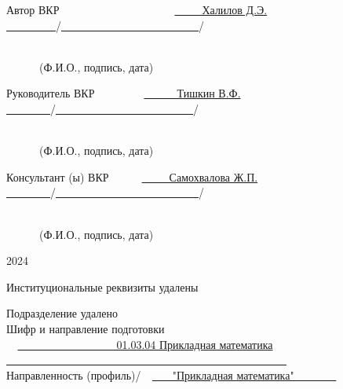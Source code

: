 \documentclass[a4paper,14pt,russian]{extreport}
\renewcommand{\_}{\kern-1.5pt\textunderscore\kern-1.5pt}
\begin{document}
	\begin{flushleft}
		Автор ВКР\ \ \ \ \ \ \ \ \ \ \ \ \ \ \ \ \ \ \ \ \  \uline{\ \ \ \ \  Халилов Д.Э. \ \ \ \ \ \ \ \ \  }/\uline{\ \ \ \ \ \ \ \ \ \ \ \ \ \ \ \ \ \ \ \ \ \ \ \ \  }/\par
		
		{\fontsize{10pt}{12.0pt}\selectfont \ \ \ \ \ \ \ \ \ \ \ \ \ \ \ \ \ \ \ \ \ \ \ \ \ \ \ \ \ \ \ \ \ \ \ \ \ \ \ \ \ \ \ \ \ \ \ \ \ \ \ \ \ \ \ \ \ \ \ \ \ \ \ \ \ \ \ \ \ \ \ \ \ \ \ \ \ \  (Ф.И.О., подпись, дата)\par}
		
		Руководитель ВКР\ \ \ \ \ \ \ \ \ \uline{\ \ \ \ \ \ Тишкин В.Ф. \ \ \ \ \ \ \ \  }/\uline{\ \ \ \ \ \ \ \ \ \ \ \ \ \ \ \ \ \ \ \ \ \ \ \ \  }/\par
		
		{\fontsize{10pt}{12.0pt}\selectfont \ \ \ \ \ \ \ \ \ \ \ \ \ \ \ \ \ \ \ \ \ \ \ \ \ \ \ \ \ \ \ \ \ \ \ \ \ \ \ \ \ \ \ \ \ \ \ \ \ \ \ \ \ \ \ \ \ \ \ \ \ \ \ \ \ \ \ \ \ \ \ \ \ \ \ \ \ \  (Ф.И.О., подпись, дата)\par}
		
		Консультант (ы) ВКР\  \ \ \ \ \  \uline{\ \ \ \ \ Самохвалова Ж.П. \ \ \ \ \ \ \ \  }/\uline{\ \ \ \ \ \ \ \ \ \ \ \ \ \ \ \ \ \ \ \ \ \ \ \ \ \  }/\par
		
		{\fontsize{10pt}{12.0pt}\selectfont \ \ \ \ \ \ \ \ \ \ \ \ \ \ \ \ \ \ \ \ \ \ \ \ \ \ \ \ \ \ \ \ \ \ \ \ \ \ \ \ \ \ \ \ \ \ \ \ \ \ \ \ \ \ \ \ \ \ \ \ \ \ \ \ \ \ \ \ \ \ \ \ \ \ \ \ \ \  (Ф.И.О., подпись, дата)\par}
		
		
	\end{flushleft}
	\begin{small}
		\begin{center}
			2024
		\end{center}
	\end{small}
	
	\thispagestyle{empty}
	
	\newpage
	\begin{center}
		Институциональные реквизиты удалены
	\end{center}
	Подразделение удалено\\
	Шифр и направление подготовки\\
	\ \textcolor{white}{п}\uline{\ \ \ \ \ \ \ \ \ \ \ \ \ \ \ \ \ \ 01.03.04 Прикладная математика \ \ \ \ \ \ \ \ \ \ \ \ \ \ \ \ \ \ \ \ \ \ \ \ \ \ \ \ \ \ \ \ \ \ \ \ \ \ \ \ \ \ \ \ \ \ \ \ \ \ \  }\\
	Направленность (профиль)/\ \textcolor{white}{п}\uline{ \ \ \ "Прикладная математика" \ \ \ \ \ \ \ }\\
	
\end{document}
